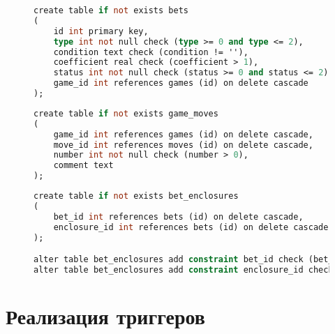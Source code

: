 \begin{figure}[H]
	\begin{lstlisting}[label=bets_lst,caption=Описание сущности bets,language=Caml]
create table if not exists bets
(
    id int primary key,
    type int not null check (type >= 0 and type <= 2),
    condition text check (condition != ''),
    coefficient real check (coefficient > 1),
    status int not null check (status >= 0 and status <= 2),
    game_id int references games (id) on delete cascade
);
	\end{lstlisting}
\end{figure}
\begin{figure}[H]
	\begin{lstlisting}[label=game_moves_lst,caption=Описание сущности game\_moves,language=Caml]
create table if not exists game_moves
(
    game_id int references games (id) on delete cascade,
    move_id int references moves (id) on delete cascade,
    number int not null check (number > 0),
    comment text
);
	\end{lstlisting}
\end{figure}
\begin{figure}[H]
	\begin{lstlisting}[label=bet_enclosures_lst,caption=Описание сущности bet\_enclosures,language=Caml]
create table if not exists bet_enclosures
(
    bet_id int references bets (id) on delete cascade,
    enclosure_id int references bets (id) on delete cascade
);

alter table bet_enclosures add constraint bet_id check (bet_id != enclosure_id);
alter table bet_enclosures add constraint enclosure_id check (bet_id != enclosure_id);
	\end{lstlisting}
\end{figure}

\section{Реализация триггеров}

